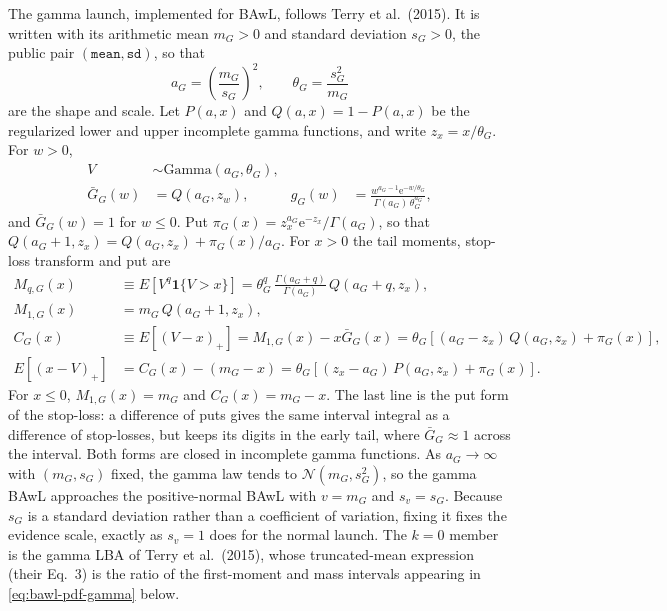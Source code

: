 \documentclass[12pt]{article}
\newcommand{\Normal}{\mathcal{N}}
\newcommand{\Gbar}{\bar{G}}
\newcommand{\e}{\mathrm{e}}
\theoremstyle{remark}
\begin{document}
The gamma launch, implemented for BAwL, follows Terry et al.\ (2015). It is written with its arithmetic mean $m_G>0$ and standard deviation $s_G>0$, the public pair $(\texttt{mean},\texttt{sd})$, so that
\begin{equation}
  a_G = \left(\frac{m_G}{s_G}\right)^2,
  \qquad
  \theta_G = \frac{s_G^2}{m_G}
  \label{eq:gamma-mean-sd}
\end{equation}
are the shape and scale. Let $P(a,x)$ and $Q(a,x)=1-P(a,x)$ be the regularized lower and upper incomplete gamma functions, and write $z_x=x/\theta_G$. For $w>0$,
\begin{align}
  V &\sim \mathrm{Gamma}(a_G,\theta_G), \\
  \Gbar_G(w) &= Q(a_G, z_w),
  &g_G(w) &= \frac{w^{a_G-1}\e^{-w/\theta_G}}{\Gamma(a_G)\,\theta_G^{a_G}},
  \label{eq:gamma-launch}
\end{align}
and $\Gbar_G(w)=1$ for $w\le0$. Put $\pi_G(x)=z_x^{a_G}\e^{-z_x}/\Gamma(a_G)$, so that $Q(a_G+1,z_x)=Q(a_G,z_x)+\pi_G(x)/a_G$. For $x>0$ the tail moments, stop-loss transform and put are
\begin{align}
  M_{q,G}(x)
    &\equiv E\!\left[V^q\mathbf 1\{V>x\}\right]
      =\theta_G^q\,\frac{\Gamma(a_G+q)}{\Gamma(a_G)}\,Q(a_G+q, z_x), \nonumber\\
  M_{1,G}(x)
    &=m_G\,Q(a_G+1,z_x), \nonumber\\
  C_G(x)
    &\equiv E[(V-x)_+]
      =M_{1,G}(x)-x\Gbar_G(x)
      =\theta_G\left[(a_G-z_x)\,Q(a_G,z_x)+\pi_G(x)\right], \nonumber\\
  E[(x-V)_+]
    &=C_G(x)-(m_G-x)
      =\theta_G\left[(z_x-a_G)\,P(a_G,z_x)+\pi_G(x)\right].
  \label{eq:gamma-tail-moments}
\end{align}
For $x\le0$, $M_{1,G}(x)=m_G$ and $C_G(x)=m_G-x$. The last line is the put form of the stop-loss: a difference of puts gives the same interval integral as a difference of stop-losses, but keeps its digits in the early tail, where $\Gbar_G\approx1$ across the interval. Both forms are closed in incomplete gamma functions. As $a_G\to\infty$ with $(m_G,s_G)$ fixed, the gamma law tends to $\Normal(m_G,s_G^2)$, so the gamma BAwL approaches the positive-normal BAwL with $v=m_G$ and $s_v=s_G$. Because $s_G$ is a standard deviation rather than a coefficient of variation, fixing it fixes the evidence scale, exactly as $s_v=1$ does for the normal launch. The $k=0$ member is the gamma LBA of Terry et al.\ (2015), whose truncated-mean expression (their Eq.~3) is the ratio of the first-moment and mass intervals appearing in \eqref{eq:bawl-pdf-gamma} below.
\end{document}
